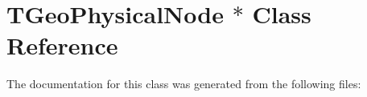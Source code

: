 \hypertarget{class_t_geo_physical_node_01_5}{
\section{TGeoPhysicalNode $\ast$ Class Reference}
\label{class_t_geo_physical_node_01_5}
}


The documentation for this class was generated from the following files: